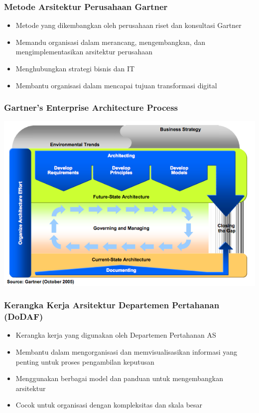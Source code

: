 \documentclass[aspectratio=169, table]{beamer}
\begin{document}
	\begin{frame}
		\frametitle{Metode Arsitektur Perusahaan Gartner}
		\begin{itemize}
			\item Metode yang dikembangkan oleh perusahaan riset dan konsultasi Gartner
			\item Memandu organisasi dalam merancang, mengembangkan, dan mengimplementasikan arsitektur perusahaan
			\item Menghubungkan strategi bisnis dan IT
			\item Membantu organisasi dalam mencapai tujuan transformasi digital
		\end{itemize}
	\end{frame}
	
	{
		\begin{frame}
			\frametitle{Gartner's Enterprise Architecture Process}
			\begin{center}
				\includegraphics[width=.75\textwidth]{../figures/gartner}
			\end{center}
		\end{frame}
	}
	
	\begin{frame}
		\frametitle{Kerangka Kerja Arsitektur Departemen Pertahanan (DoDAF)}
		\begin{itemize}
			\item Kerangka kerja yang digunakan oleh Departemen Pertahanan AS
			\item Membantu dalam mengorganisasi dan memvisualisasikan informasi yang penting untuk proses pengambilan keputusan
			\item Menggunakan berbagai model dan panduan untuk mengembangkan arsitektur
			\item Cocok untuk organisasi dengan kompleksitas dan skala besar
		\end{itemize}
	\end{frame}
	
\end{document}
